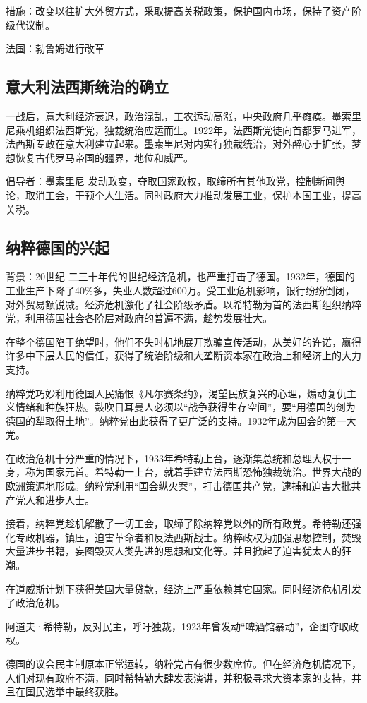 措施：改变以往扩大外贸方式，采取提高关税政策，保护国内市场，保持了资产阶级代议制。

法国：勃鲁姆进行改革

\subsection{意大利法西斯统治的确立}
一战后，意大利经济衰退，政治混乱，工农运动高涨，中央政府几乎瘫痪。墨索里尼乘机组织法西斯党，独裁统治应运而生。1922年，法西斯党徒向首都罗马进军，法西斯专政在意大利建立起来。墨索里尼对内实行独裁统治，对外醉心于扩张，梦想恢复古代罗马帝国的疆界，地位和威严。

倡导者：墨索里尼  发动政变，夺取国家政权，取缔所有其他政党，控制新闻舆论，取消工会，干预个人生活。同时政府大力推动发展工业，保护本国工业，提高关税。

\subsection{纳粹德国的兴起}
背景：20世纪 二三十年代的世纪经济危机，也严重打击了德国。1932年，德国的工业生产下降了40\%多，失业人数超过600万。受工业危机影响，银行纷纷倒闭，对外贸易额锐减。经济危机激化了社会阶级矛盾。以希特勒为首的法西斯组织纳粹党，利用德国社会各阶层对政府的普遍不满，趁势发展壮大。

在整个德国陷于绝望时，他们不失时机地展开欺骗宣传活动，从美好的许诺，赢得许多中下层人民的信任，获得了统治阶级和大垄断资本家在政治上和经济上的大力支持。

纳粹党巧妙利用德国人民痛恨《凡尔赛条约》，渴望民族复兴的心理，煽动复仇主义情绪和种族狂热。鼓吹日耳曼人必须以“战争获得生存空间”，要“用德国的剑为德国的犁取得土地”。纳粹党由此获得了更广泛的支持。1932年成为国会的第一大党。

在政治危机十分严重的情况下，1933年希特勒上台，逐渐集总统和总理大权于一身，称为国家元首。希特勒一上台，就着手建立法西斯恐怖独裁统治。世界大战的欧洲策源地形成。纳粹党利用“国会纵火案”，打击德国共产党，逮捕和迫害大批共产党人和进步人士。

接着，纳粹党趁机解散了一切工会，取缔了除纳粹党以外的所有政党。希特勒还强化专政机器，镇压，迫害革命者和反法西斯战士。纳粹政权为加强思想控制，焚毁大量进步书籍，妄图毁灭人类先进的思想和文化等。并且掀起了迫害犹太人的狂潮。

在道威斯计划下获得美国大量贷款，经济上严重依赖其它国家。同时经济危机引发了政治危机。

阿道夫·希特勒，反对民主，呼吁独裁，1923年曾发动“啤酒馆暴动”，企图夺取政权。

德国的议会民主制原本正常运转，纳粹党占有很少数席位。但在经济危机情况下，人们对现有政府不满，同时希特勒大肆发表演讲，并积极寻求大资本家的支持，并且在国民选举中最终获胜。

